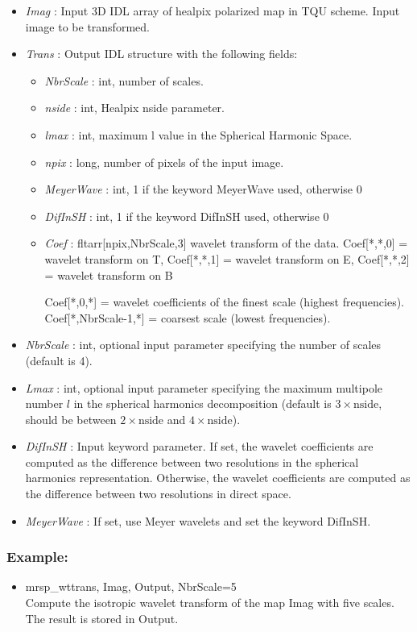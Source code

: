 \begin{itemize}
\item {\em Imag} : Input 3D IDL array of healpix polarized map in TQU scheme. Input image to be transformed.
\item {\em Trans} : Output IDL structure with the following fields:
\begin{itemize}
\item {\em NbrScale} : int, number of scales.
\item {\em nside} : int, Healpix nside parameter.
\item {\em lmax} : int, maximum l value in the Spherical Harmonic Space.
\item {\em npix} : long, number of pixels of the input image.
\item {\em MeyerWave} : int, 1 if the keyword MeyerWave used, otherwise 0
\item {\em DifInSH} : int, 1 if the keyword DifInSH used, otherwise 0
\item {\em Coef} : fltarr[npix,NbrScale,3] wavelet transform of the data. Coef[*,*,0] = wavelet transform on T, Coef[*,*,1] = wavelet transform on E, Coef[*,*,2] = wavelet transform on B
\begin{center}
Coef[*,0,*] = wavelet coefficients of the finest scale (highest frequencies).\\
Coef[*,NbrScale-1,*] = coarsest scale (lowest frequencies). 
\end{center}
\end{itemize}
\item {\em NbrScale} : int, optional input parameter specifying the number of scales (default is 4).
\item {\em Lmax} : int, optional input parameter specifying the maximum multipole number $l$ in the spherical harmonics decomposition 
(default is $3\times \textrm{nside}$, should be between $2\times \textrm{nside}$ and $4\times \textrm{nside}$).
\item {\em DifInSH} : Input keyword parameter. If set, the wavelet coefficients are computed as the difference between two resolutions in the spherical harmonics representation. 
Otherwise, the wavelet coefficients are computed as the difference between two resolutions in direct space.
\item {\em MeyerWave} : If set, use Meyer wavelets and set the keyword DifInSH.
\end{itemize}

\subsubsection*{Example:} 
\begin{itemize}
\item mrsp\_wttrans, Imag, Output, NbrScale=5 \\
Compute the isotropic wavelet transform of the map Imag with five scales. The result is stored in Output.
\end{itemize}



